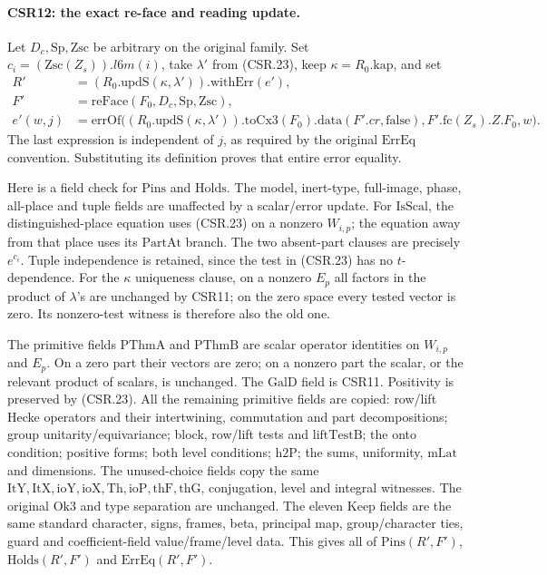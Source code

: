 \paragraph{CSR12: the exact re-face and reading update.}
\label{claim:CSR12}
Let \(D_c,\mathrm{Sp},\mathrm{Zsc}\) be arbitrary on the original
family. Set \(c_i=(\mathrm{Zsc}(Z_s)).l6m(i)\), take
\(\lambda'\) from (CSR.23), keep \(\kappa=R_0.\mathrm{kap}\),
and set
\[
 \begin{split}
 R'&=(R_0.\mathrm{updS}(\kappa,\lambda')).\mathrm{withErr}(e'),\\
 F'&=\mathrm{reFace}(F_0,D_c,\mathrm{Sp},\mathrm{Zsc}),\\
 e'(w,j)&=\mathrm{errOf}\bigl((R_0.\mathrm{updS}(\kappa,\lambda'))
                 .\mathrm{toCx3}(F_0).\mathrm{data}(F'.cr,\mathrm{false}),
                    F'.\mathrm{fc}(Z_s).Z.F_0,w\bigr).
 \end{split}                                                    \tag{CSR.26}
\]
The last expression is independent of \(j\), as required by the
original \(\mathrm{ErrEq}\) convention. Substituting its definition
proves that entire error equality.

Here is a field check for \(\mathrm{Pins}\) and \(\mathrm{Holds}\).
The model, inert-type, full-image, phase, all-place and tuple
fields are unaffected by a scalar/error update. For
\(\mathrm{IsScal}\), the distinguished-place equation uses
(CSR.23) on a nonzero \(W_{i,p}\); the equation away from that
place uses its \(\mathrm{PartAt}\) branch. The two absent-part
clauses are precisely \(e^{c_i}\). Tuple independence is retained,
since the test in (CSR.23) has no \(t\)-dependence. For the
\(\kappa\) uniqueness clause, on a nonzero \(E_p\) all factors
in the product of \(\lambda\)'s are unchanged by CSR11; on
the zero space every tested vector is zero. Its nonzero-test
witness is therefore also the old one.

The primitive fields \(\mathrm{PThmA}\) and \(\mathrm{PThmB}\)
are scalar operator identities on \(W_{i,p}\) and \(E_p\).
On a zero part their vectors are zero; on a nonzero part the
scalar, or the relevant product of scalars, is unchanged.
The \(\mathrm{GalD}\) field is CSR11. Positivity is preserved
by (CSR.23). All the remaining primitive fields are copied:
row/lift Hecke operators and their intertwining, commutation
and part decompositions; group unitarity/equivariance; block,
row/lift tests and \(\mathrm{liftTestB}\); the onto condition;
positive forms; both level conditions; \(\mathrm{h2P}\);
the sums, uniformity, \(\mathrm{mLat}\) and dimensions.
The unused-choice fields copy the same
\(\mathrm{ItY,ItX,ioY,ioX,Th,ioP,thF,thG}\), conjugation,
level and integral witnesses. The original \(\mathrm{Ok3}\)
and type separation are unchanged. The eleven \(\mathrm{Keep}\)
fields are the same standard character, signs, frames, beta,
principal map, group/character ties, guard and coefficient-field
value/frame/level data. This gives all of
\(\mathrm{Pins}(R',F')\), \(\mathrm{Holds}(R',F')\) and
\(\mathrm{ErrEq}(R',F')\).


